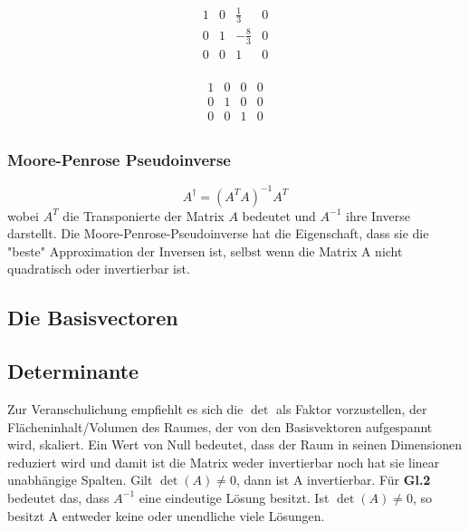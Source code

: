 \documentclass[letterpaper, titlepage]{article}
\begin{document}
\[
\begin{array}{ccc|c}
    1 & 0 & \frac{1}{3} & 0 \\
    0 & 1 & -\frac{8}{3} & 0 \\
    0 & 0 & 1 & 0 \\
\end{array}
\]

\[
\begin{array}{ccc|c}
    1 & 0 & 0 & 0 \\
    0 & 1 & 0 & 0 \\
    0 & 0 & 1 & 0 \\
\end{array}
\]


\vspace{0.35cm}

\subsubsection{Moore-Penrose Pseudoinverse}\label{Moore-Penrose Pseudoinverse}
$$ A^\dagger = (A^T A)^{-1}A^T$$
wobei $A^T$ die Transponierte der Matrix $A$ bedeutet und $A^{-1}$ ihre Inverse darstellt. Die Moore-Penrose-Pseudoinverse hat die Eigenschaft, dass sie die "beste" Approximation der Inversen ist, selbst wenn die Matrix A nicht quadratisch oder invertierbar ist. 

\vspace{0.35cm}

\subsection{Die Basisvectoren}\label{Die Basisvectoren}

\vspace{0.35cm}

\subsection{Determinante}\label{Determinante}
Zur Veranschulichung empfiehlt es sich die $\det$ als Faktor vorzustellen, der Flächeninhalt/Volumen des Raumes, der von den Basisvektoren aufgespannt wird, skaliert. Ein Wert von Null bedeutet, dass der Raum in seinen Dimensionen reduziert wird und damit ist die Matrix weder invertierbar noch hat sie linear unabhängige Spalten. Gilt $\det(A)\neq0$, dann ist A invertierbar. Für \textbf{Gl.2} bedeutet das, dass $A^{-1}$ eine eindeutige Lösung besitzt. Ist $\det(A)\neq0$, so besitzt A entweder keine oder unendliche viele Lösungen.
\end{document}
